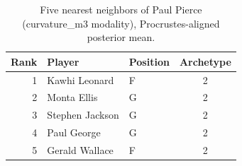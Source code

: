 \begin{table}[htbp]
  \centering\small
  \begin{tabular}{rllc}
    \toprule
    Rank & Player & Position & Archetype \\
    \midrule
    1 & Kawhi Leonard & F & 2 \\
    2 & Monta Ellis & G & 2 \\
    3 & Stephen Jackson & G & 2 \\
    4 & Paul George & G & 2 \\
    5 & Gerald Wallace & F & 2 \\
    \bottomrule
  \end{tabular}
  \caption{Five nearest neighbors of Paul Pierce (curvature_m3 modality), Procrustes-aligned posterior mean.}
  \label{tab:Paul_Pierce_neighbors_curvature_m3}
\end{table}

